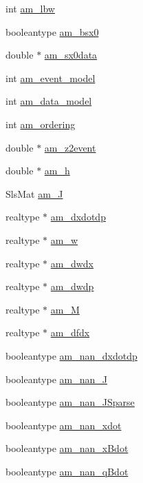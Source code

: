 \begin{DoxyCompactItemize}
\item 
int \hyperlink{struct_user_data_a0fd271dea83e804c7b1ef82a2b0ab76c}{am\+\_\+lbw}
\item 
booleantype \hyperlink{struct_user_data_a87d2f917b1bea7fea2d5878ccd43c7db}{am\+\_\+bsx0}
\item 
double $\ast$ \hyperlink{struct_user_data_a7ac27602345668b3a2bcabac4c7af733}{am\+\_\+sx0data}
\item 
int \hyperlink{struct_user_data_ace3cae0f78a3365a5fac7d7daa9928ff}{am\+\_\+event\+\_\+model}
\item 
int \hyperlink{struct_user_data_a83373144a2adb9f97cdfca2dfc79ce80}{am\+\_\+data\+\_\+model}
\item 
int \hyperlink{struct_user_data_a260a14e35469f1516b194f4f065a9794}{am\+\_\+ordering}
\item 
double $\ast$ \hyperlink{struct_user_data_af16fc75b57c68ab1d3784cc71ab073a9}{am\+\_\+z2event}
\item 
double $\ast$ \hyperlink{struct_user_data_a1a976a80dc74446059468485a0f279e1}{am\+\_\+h}
\item 
Sls\+Mat \hyperlink{struct_user_data_a822be7d2872832008aa0b7c0282b04f6}{am\+\_\+\+J}
\item 
realtype $\ast$ \hyperlink{struct_user_data_a04716137a064f7c6d85c04aeb235b4f0}{am\+\_\+dxdotdp}
\item 
realtype $\ast$ \hyperlink{struct_user_data_a8ecd7286d3c2cd32378874fb1be8da37}{am\+\_\+w}
\item 
realtype $\ast$ \hyperlink{struct_user_data_a0dee61b81181232717bffd84f3535b53}{am\+\_\+dwdx}
\item 
realtype $\ast$ \hyperlink{struct_user_data_a7a0e690a17e9784061b5d50b6eafa442}{am\+\_\+dwdp}
\item 
realtype $\ast$ \hyperlink{struct_user_data_aed8938f3dd5b3c2a72c41d09907ec435}{am\+\_\+\+M}
\item 
realtype $\ast$ \hyperlink{struct_user_data_add62c739ea5cc6d2a6be03eb2bbdfe95}{am\+\_\+dfdx}
\item 
booleantype \hyperlink{struct_user_data_a82073e35d78644037fb7570a4608d6de}{am\+\_\+nan\+\_\+dxdotdp}
\item 
booleantype \hyperlink{struct_user_data_a9e2b4f94b4dbe949e636af5cabbd47cf}{am\+\_\+nan\+\_\+\+J}
\item 
booleantype \hyperlink{struct_user_data_a56f3a28c756fe2ec27609fc7b6b8eba7}{am\+\_\+nan\+\_\+\+J\+Sparse}
\item 
booleantype \hyperlink{struct_user_data_a53aa8cfb8e4f8c3b6684b6947cc1f5c8}{am\+\_\+nan\+\_\+xdot}
\item 
booleantype \hyperlink{struct_user_data_a31f1bd5bfd2c4b1e679b77a96a35e912}{am\+\_\+nan\+\_\+x\+Bdot}
\item 
booleantype \hyperlink{struct_user_data_ae0ff98d15a201a25bab372fe26bd1523}{am\+\_\+nan\+\_\+q\+Bdot}
\end{DoxyCompactItemize}


